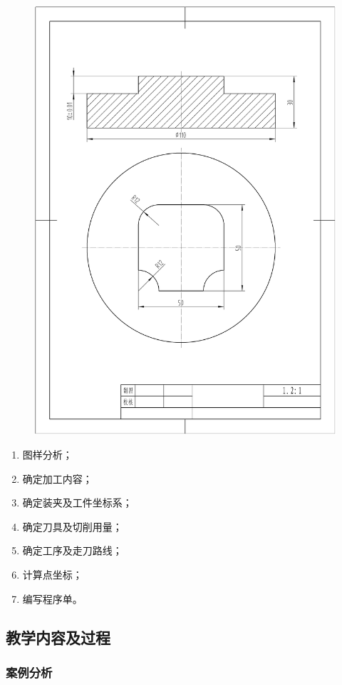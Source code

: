 \begin{figure}[h]
    \centering
    \includegraphics[width=0.8\linewidth,trim=50 150 50 100,clip]{data/image/5-1.jpg}
    \caption{}
    \label{fig:5-1}
\end{figure}

\begin{enumerate}[1、]
    \item 图样分析；
    \item 确定加工内容；
    \item 确定装夹及工件坐标系；
    \item 确定刀具及切削用量；
    \item 确定工序及走刀路线；
    \item 计算点坐标；
    \item 编写程序单。
\end{enumerate}

\subsection{教学内容及过程}

\subsubsection{案例分析}

